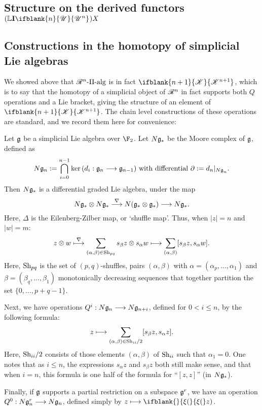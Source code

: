 \documentclass[10pt]{article}
\newcommand{\PRLie}[1]{\scrR^{#1}}%
\newcommand{\LL}[1]{\ifblank{#1}{\scrK}{\scrK^{#1}}}
\newcommand{\nontop}[1]{\ifblank{#1}{\scrU}{\scrU^{#1}}}
\newcommand{\PiAlg}[1]{#1\textup{-$\Pi$-alg}}
\newcommand{\Ind}[2][]{\mathbf{I}{#2}_{#1}}%
\newcommand{\restn}[2][]{\ifblank{#1}{\xi{#2}}{\xi_{#1}{#2}}}%
\newcommand{\derived}{\mathbb{L}}
\renewcommand{\Q}{Q}
\newcommand{\Shuffles}[2]{\textup{Sh}_{#1#2}}
\newcommand{\HalfShuffles}[2]{\textup{Sh}_{#1#2}/2}
\begin{document}
\begin{LieLambdaStructureOnKoszul}
\section{Structure on the derived functors $(\derived\Ind{\nontop{n}})X$}
\subsection{Constructions in the homotopy of simplicial Lie algebras}
We showed above that $\PiAlg{\PRLie{n}}$ is in fact $\LL{n+1}$, which is to say that the homotopy of a simplicial object of $\PRLie{n}$ in fact supports both $\Q$ operations and a Lie bracket, giving the structure of an element of $\LL{n+1}$. The chain level constructions of these operations are standard, and we record them here for convenience:

Let $\mathfrak{g}$ be a simplicial Lie algebra over $\F_2$. Let $N\mathfrak{g}_*$ be the Moore complex of $\mathfrak{g}$, defined as
\[N\mathfrak{g}_n:=\bigcap_{i=0}^{n-1}\textup{ker}\,(d_i:\mathfrak{g}_n\longrightarrow\mathfrak{g}_{n-1})\textup{ with differential }\partial:=d_n|_{{N\mathfrak{g}}_n}.\]
Then $N\mathfrak{g}_*$ is a differential graded Lie algebra, under the map
\[N\mathfrak{g}_*\otimes N\mathfrak{g}_*\overset{\nabla}{\longrightarrow}N(\mathfrak{g}_*\otimes \mathfrak{g}_*)\longrightarrow N\mathfrak{g}_*.\]
Here, $\Delta$ is the Eilenberg-Zilber map, or `shuffle map'. Thus, when $|z|=n$ and $|w|=m$:
\[z\otimes w\overset{\nabla}{\mapsto}\sum_{(\alpha,\beta)\in\Shuffles{p}{q}}s_\beta z\otimes s_\alpha w\mapsto \sum_{(\alpha,\beta)}[s_\beta z, s_\alpha w].\]
Here, $\Shuffles{p}{q}$ is the set of $(p,q)$-shuffles, pairs $(\alpha,\beta)$ with $\alpha=(\alpha_p,\ldots,\alpha_1)$ and $\beta=(\beta_q,\ldots,\beta_1)$ monotonically decreasing sequences that together partition the set $\{0,\ldots,p+q-1\}$.

Next, we have operations $\Q^i:N\frakg_n\to N\frakg_{n+i}$, defined for $0<i\leq n$, by the following formula:
\[z\mapsto \sum_{{(\alpha,\beta)\in\HalfShuffles{i}{i}}}[s_\beta z, s_\alpha z].\]
Here, $\HalfShuffles{i}{i}$ consists of those elements $(\alpha,\beta)$ of $\Shuffles{i}{i}$ such that $\alpha_1=0$.
One notes that as $i\leq n$, the expressions $s_\alpha z$ and $s_\beta z$ both still make sense, and that when $i=n$, this formula is one half of the formula for ``$[z,z]$'' (in $N\mathfrak{g}_*$).

Finally, if $\mathfrak{g}$ supports a partial restriction on a subspace $\mathfrak{g}^r$, we have an operation $\Q^0:N\frakg^r_n\to N\frakg_n$, defined simply by $z\mapsto\restn(z)$.


\end{LieLambdaStructureOnKoszul}
\end{document}
